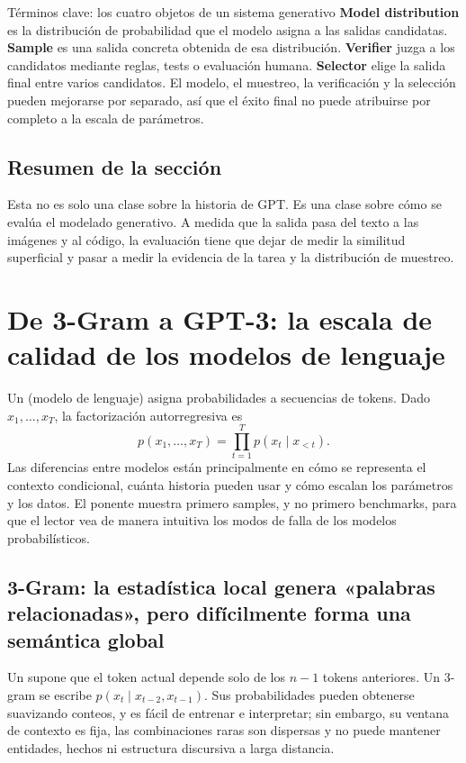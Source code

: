\documentclass[a4paper]{article}
\begin{document}
\begin{knowledgebox}{Términos clave: los cuatro objetos de un sistema generativo}
\textbf{Model distribution} es la distribución de probabilidad que el modelo asigna a las salidas candidatas. \textbf{Sample} es una salida concreta obtenida de esa distribución. \textbf{Verifier} juzga a los candidatos mediante reglas, tests o evaluación humana. \textbf{Selector} elige la salida final entre varios candidatos. El modelo, el muestreo, la verificación y la selección pueden mejorarse por separado, así que el éxito final no puede atribuirse por completo a la escala de parámetros.
\end{knowledgebox}

\subsection{Resumen de la sección}

Esta no es solo una clase sobre la historia de GPT. Es una clase sobre cómo se evalúa el modelado generativo. A medida que la salida pasa del texto a las imágenes y al código, la evaluación tiene que dejar de medir la similitud superficial y pasar a medir la evidencia de la tarea y la distribución de muestreo.
\section{De 3-Gram a GPT-3: la escala de calidad de los modelos de lenguaje}

Un  (modelo de lenguaje) asigna probabilidades a secuencias de tokens. Dado $x_1,\ldots,x_T$, la factorización autorregresiva es
\[
p(x_1,\ldots,x_T)=\prod_{t=1}^{T}p(x_t\mid x_{<t}).
\]
Las diferencias entre modelos están principalmente en cómo se representa el contexto condicional, cuánta historia pueden usar y cómo escalan los parámetros y los datos. El ponente muestra primero samples, y no primero benchmarks, para que el lector vea de manera intuitiva los modos de falla de los modelos probabilísticos.

\subsection{3-Gram: la estadística local genera «palabras relacionadas», pero difícilmente forma una semántica global}

Un  supone que el token actual depende solo de los $n-1$ tokens anteriores. Un 3-gram se escribe $p(x_t\mid x_{t-2},x_{t-1})$. Sus probabilidades pueden obtenerse suavizando conteos, y es fácil de entrenar e interpretar; sin embargo, su ventana de contexto es fija, las combinaciones raras son dispersas y no puede mantener entidades, hechos ni estructura discursiva a larga distancia.
\end{document}
